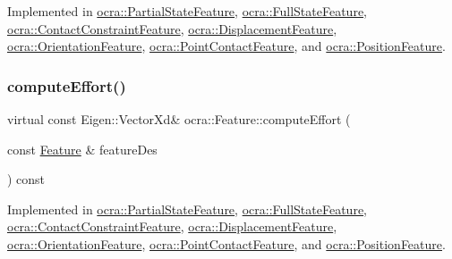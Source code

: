 Implemented in \hyperlink{classocra_1_1PartialStateFeature_a7ed5a87165deed25a91f073e348c53a3}{ocra\+::\+Partial\+State\+Feature}, \hyperlink{classocra_1_1FullStateFeature_a7e668c7fa50e2ee6947c2f97dcd18e4e}{ocra\+::\+Full\+State\+Feature}, \hyperlink{classocra_1_1ContactConstraintFeature_a8537fa220270cf526014f0c4f5e6ea75}{ocra\+::\+Contact\+Constraint\+Feature}, \hyperlink{classocra_1_1DisplacementFeature_a1f2fa6644359c3897ac8d3e4e06c5f81}{ocra\+::\+Displacement\+Feature}, \hyperlink{classocra_1_1OrientationFeature_a948340f06a913d3c56fb306f65c3ad81}{ocra\+::\+Orientation\+Feature}, \hyperlink{classocra_1_1PointContactFeature_a4266a665917b98bb507c4047c9bf6c0c}{ocra\+::\+Point\+Contact\+Feature}, and \hyperlink{classocra_1_1PositionFeature_ad8cc562d88824f58ee21a1b1476edd4b}{ocra\+::\+Position\+Feature}.

\hypertarget{classocra_1_1Feature_a19626a241666fdae253af1f7b6f2acd7}{}\label{classocra_1_1Feature_a19626a241666fdae253af1f7b6f2acd7} 
\subsubsection{\texorpdfstring{compute\+Effort()}{computeEffort()}\hspace{0.1cm}{\footnotesize\ttfamily [1/2]}}
{\footnotesize\ttfamily virtual const Eigen\+::\+Vector\+Xd\& ocra\+::\+Feature\+::compute\+Effort (\begin{DoxyParamCaption}\item[{const \hyperlink{classocra_1_1Feature}{Feature} \&}]{feature\+Des }\end{DoxyParamCaption}) const\hspace{0.3cm}{\ttfamily [pure virtual]}}



Implemented in \hyperlink{classocra_1_1PartialStateFeature_a96de4c58baceb9430a1845c4db6ecdfc}{ocra\+::\+Partial\+State\+Feature}, \hyperlink{classocra_1_1FullStateFeature_aac81e14af36ee0fb2ff24f991a1915eb}{ocra\+::\+Full\+State\+Feature}, \hyperlink{classocra_1_1ContactConstraintFeature_ab545e20b58d45b47a0e2f2a0a64f9c48}{ocra\+::\+Contact\+Constraint\+Feature}, \hyperlink{classocra_1_1DisplacementFeature_a328fae77ec8a9942881e42226250a11b}{ocra\+::\+Displacement\+Feature}, \hyperlink{classocra_1_1OrientationFeature_a3aef6b9e83419882a81792804d8da00e}{ocra\+::\+Orientation\+Feature}, \hyperlink{classocra_1_1PointContactFeature_a081fc445440857623f3df1b272a80871}{ocra\+::\+Point\+Contact\+Feature}, and \hyperlink{classocra_1_1PositionFeature_a9cb07e0db4d84c5faa228676712e9120}{ocra\+::\+Position\+Feature}.

